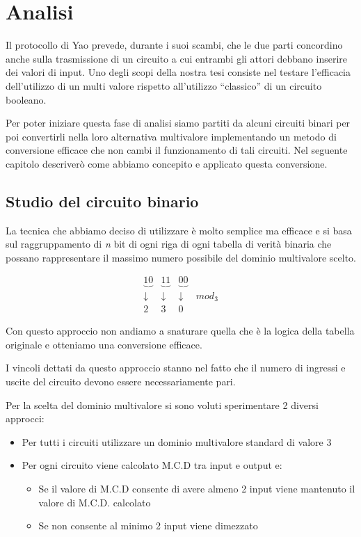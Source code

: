 \documentclass[
  italian,
]{book}
\providecommand{\tightlist}{%
  \setlength{\itemsep}{0pt}\setlength{\parskip}{0pt}}
\begin{document}
\hypertarget{analisi}{%
\chapter{Analisi}\label{analisi}}

Il protocollo di Yao prevede, durante i suoi scambi, che le due parti concordino anche sulla trasmissione di un circuito a cui entrambi gli attori debbano inserire dei valori di input. Uno degli scopi della nostra tesi consiste nel testare l'efficacia dell'utilizzo di un multi valore rispetto all'utilizzo ``classico'' di un circuito booleano.

Per poter iniziare questa fase di analisi siamo partiti da alcuni circuiti binari per poi convertirli nella loro alternativa
multivalore implementando un metodo di conversione efficace che non cambi il funzionamento di tali circuiti. Nel seguente capitolo descriverò come abbiamo concepito e applicato questa conversione.

\newpage

\hypertarget{studio-del-circuito-binario}{%
\section{Studio del circuito binario}\label{studio-del-circuito-binario}}

La tecnica che abbiamo deciso di utilizzare è molto semplice ma efficace e si basa sul raggruppamento di \emph{n} bit di ogni
riga di ogni tabella di verità binaria che possano rappresentare il massimo numero possibile del dominio multivalore
scelto.

\[\begin{matrix}
    \underbrace{10} & \underbrace{11} & \underbrace{00} \\
    \downarrow & \downarrow & \downarrow  &mod_3 \\
    2 & 3 & 0
\end{matrix}\]

Con questo approccio non andiamo a snaturare quella che è la logica della tabella originale e otteniamo una
conversione efficace.

I vincoli dettati da questo approccio stanno nel fatto che il numero di ingressi e uscite del circuito devono essere necessariamente pari.

Per la scelta del dominio multivalore si sono voluti sperimentare 2 diversi approcci:

\begin{itemize}
\tightlist
\item
  Per tutti i circuiti utilizzare un dominio multivalore standard di valore 3
\item
  Per ogni circuito viene calcolato M.C.D tra input e output e:

  \begin{itemize}
  \tightlist
  \item
    Se il valore di M.C.D consente di avere almeno 2 input viene mantenuto il valore di M.C.D. calcolato
  \item
    Se non consente al minimo 2 input viene dimezzato
  \end{itemize}
\end{itemize}
\end{document}
